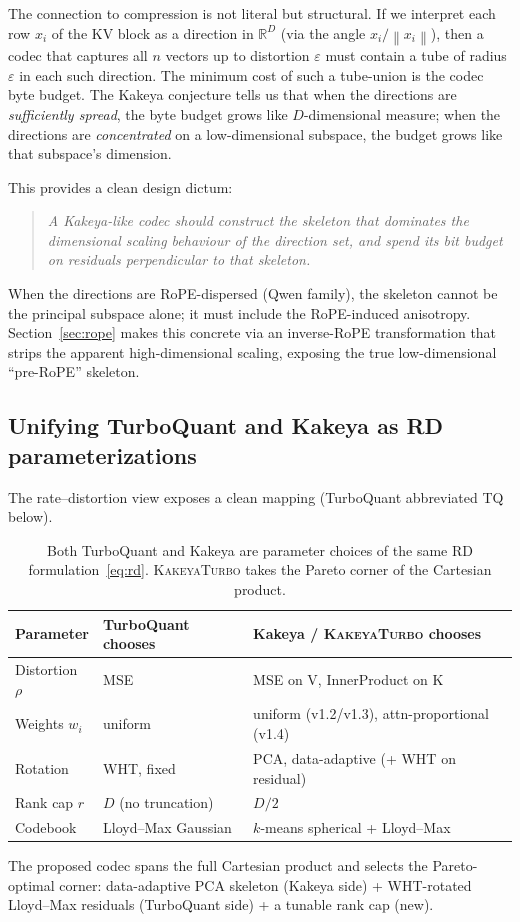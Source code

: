 \documentclass[11pt,a4paper]{article}
\theoremstyle{definition}
\theoremstyle{plain}
\newcommand{\R}{\mathbb{R}}
\newcommand{\norm}[1]{\left\lVert#1\right\rVert}
\begin{document}
The connection to compression is not literal but structural. If we interpret each row $x_i$ of the KV block as a direction in $\R^D$ (via the angle $x_i / \norm{x_i}$), then a codec that captures all $n$ vectors up to distortion $\varepsilon$ must contain a tube of radius $\varepsilon$ in each such direction. The minimum cost of such a tube-union is the codec byte budget. The Kakeya conjecture tells us that when the directions are \emph{sufficiently spread}, the byte budget grows like $D$-dimensional measure; when the directions are \emph{concentrated} on a low-dimensional subspace, the budget grows like that subspace's dimension.

This provides a clean design dictum:
\begin{quote}
\emph{A Kakeya-like codec should construct the skeleton that dominates the dimensional scaling behaviour of the direction set, and spend its bit budget on residuals perpendicular to that skeleton.}
\end{quote}
When the directions are RoPE-dispersed (Qwen family), the skeleton cannot be the principal subspace alone; it must include the RoPE-induced anisotropy. Section~\ref{sec:rope} makes this concrete via an inverse-RoPE transformation that strips the apparent high-dimensional scaling, exposing the true low-dimensional ``pre-RoPE'' skeleton.

\subsection{Unifying TurboQuant and Kakeya as RD parameterizations}

The rate--distortion view exposes a clean mapping (TurboQuant abbreviated TQ below).
\begin{table}[H]
\centering
\small
\caption{Both TurboQuant and Kakeya are parameter choices of the same RD formulation~\eqref{eq:rd}. \textsc{KakeyaTurbo} takes the Pareto corner of the Cartesian product.}
\label{tab:rd-mapping}
\begin{tabular}{lll}
  \toprule
  Parameter & TurboQuant chooses & Kakeya / \textsc{KakeyaTurbo} chooses \\
  \midrule
  Distortion $\rho$ & MSE & MSE on V, InnerProduct on K \\
  Weights $w_i$ & uniform & uniform (v1.2/v1.3), attn-proportional (v1.4) \\
  Rotation & WHT, fixed & PCA, data-adaptive (+ WHT on residual) \\
  Rank cap $r$ & $D$ (no truncation) & $D/2$ \\
  Codebook & Lloyd--Max Gaussian & $k$-means spherical + Lloyd--Max \\
  \bottomrule
\end{tabular}
\end{table}
The proposed codec spans the full Cartesian product and selects the Pareto-optimal corner: data-adaptive PCA skeleton (Kakeya side) + WHT-rotated Lloyd--Max residuals (TurboQuant side) + a tunable rank cap (new).
\end{document}
